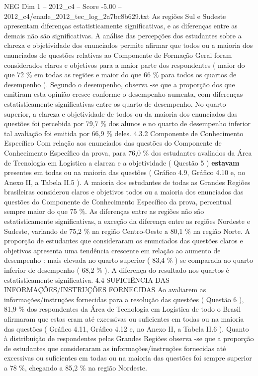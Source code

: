 \begin{textsample}{NEG Dim 1 – 2012\_c4 – Score -5.00 – 2012\_c4/enade\_2012\_tec\_log\_2a7bc8b629.txt}
As regiões Sul e Sudeste apresentam diferenças estatisticamente significativas, e as diferenças entre as demais não são significativas.
A análise das percepções dos estudantes sobre a clareza e objetividade dos enunciados permite afirmar que todos ou a maioria dos enunciados de questões relativas ao Componente de Formação Geral foram considerados claros e objetivos para a maior parte dos respondentes ( maior do que 72 \% em todas as regiões e maior do que 66 \% para todos os quartos de desempenho ).
Segundo o desempenho, observa -se que a proporção dos que emitiram esta opinião cresce conforme o desempenho aumenta, com diferenças estatisticamente significativas entre os quarto de desempenho.
No quarto superior, a clareza e objetividade de todos ou da maioria dos enunciados das questões foi percebida por 79,7 \% dos alunos e no quarto de desempenho inferior tal avaliação foi emitida por 66,9 \% deles. 4.3.2 Componente de Conhecimento Específico Com relação aos enunciados das questões do Componente de Conhecimento Específico da prova, para 76,0 \% dos estudantes avaliados da Área de Tecnologia em Logística a clareza e a objetividade ( Questão 5 ) \textbf{estavam} presentes em todas ou na maioria das questões ( Gráfico 4.9, Gráfico 4.10 e, no Anexo II, a Tabela II.5 ).
A maioria dos estudantes de todas as Grandes Regiões brasileiras considerou claros e objetivos todos ou a maioria dos enunciados das questões do Componente de Conhecimento Específico da prova, percentual sempre maior do que 75 \%.
As diferenças entre as regiões não são estatisticamente significativas, a exceção da diferença entre as regiões Nordeste e Sudeste, variando de 75,2 \% na região Centro-Oeste a 80,1 \% na região Norte.
A proporção de estudantes que consideraram os enunciados das questões claros e objetivos apresenta uma tendência crescente em relação ao aumento de desempenho : mais elevada no quarto superior ( 83,4 \% ) se comparada ao quarto inferior de desempenho ( 68,2 \% ).
A diferença do resultado nos quartos é estatisticamente significativa. 4.4 SUFICIÊNCIA DAS INFORMAÇÕES/INSTRUÇÕES FORNECIDAS Ao avaliarem as informações/instruções fornecidas para a resolução das questões ( Questão 6 ), 81,9 \% dos respondentes da Área de Tecnologia em Logística de todo o Brasil afirmaram que estas eram até excessivas ou suficientes em todas ou na maioria das questões ( Gráfico 4.11, Gráfico 4.12 e, no Anexo II, a Tabela II.6 ).
Quanto à distribuição de respondentes pelas Grandes Regiões observa -se que a proporção de estudantes que consideraram as informações/instruções fornecidas até excessivas ou suficientes em todas ou na maioria das questões foi sempre superior a 78 \%, chegando a 85,2 \% na região Nordeste.

\end{textsample}
